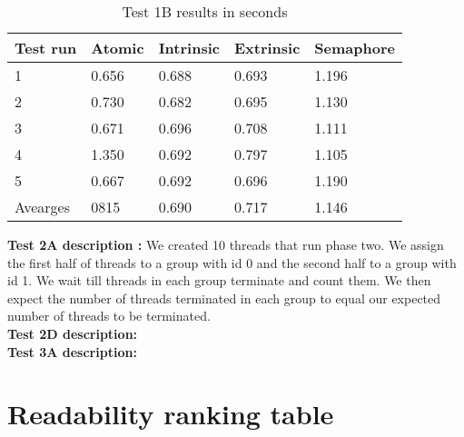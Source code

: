 \documentclass[11pt]{article}
\begin{document}
\begin{table}[H]
\centering
\caption{Test 1B results in seconds}
\label{tab:my-table}
\begin{tabular}{|l|l|l|l|l|}
\hline
Test run & Atomic & Intrinsic & Extrinsic & Semaphore \\ \hline
1        & 0.656  & 0.688     & 0.693     & 1.196     \\ \hline
2        & 0.730  & 0.682     & 0.695     & 1.130     \\ \hline
3        & 0.671  & 0.696     & 0.708     & 1.111     \\ \hline
4        & 1.350  & 0.692     & 0.797     & 1.105     \\ \hline
5        & 0.667  & 0.692     & 0.696     & 1.190     \\ \hline
Avearges & 0815   & 0.690     & 0.717     & 1.146     \\ \hline
\end{tabular}
\end{table}

\textbf{Test 2A description :} We created 10 threads that run phase two. We assign the first half of threads to a group with id 0 and the second half to a group with id 1. We wait till threads in each group terminate and count them. We then expect the number of threads terminated in each group to equal our expected number of threads to be terminated. \\


\textbf{Test 2D description:}
\\

\textbf{Test 3A description:}
\\


\section{Readability ranking table}
\end{document}
